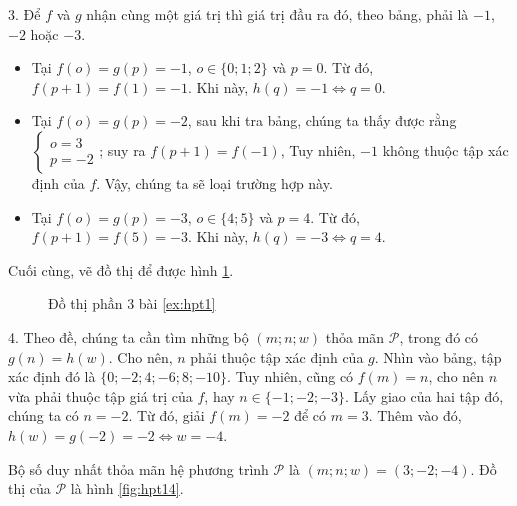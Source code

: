 3. Để $f$ và $g$ nhận cùng một giá trị thì giá trị đầu ra đó, theo bảng, phải là $-1$, $-2$ hoặc $-3$.
\begin{itemize}
   \item Tại $f(o) = g(p) = -1$, $o \in \{0; 1; 2\}$ và $p = 0$. Từ đó, $f(p + 1) = f(1) = -1$. Khi này, $h(q) = -1 \iff q = 0$.
   \item Tại $f(o) = g(p) = -2$, sau khi tra bảng, chúng ta thấy được rằng $\begin{cases}o = 3\\p = -2\end{cases}$; suy ra $f(p + 1) = f(-1)$, Tuy nhiên, $-1$ không thuộc tập xác định của $f$. Vậy, chúng ta sẽ loại trường hợp này.
   \item Tại $f(o) = g(p) = -3$, $o \in \{4; 5\}$ và $p = 4$. Từ đó, $f(p + 1) = f(5) = -3$. Khi này, $h(q) = -3 \iff q = 4$.
\end{itemize}
Cuối cùng, vẽ đồ thị để được hình \ref{fig:hpt13}.

\begin{figure}[H]
   \centering
   \caption{Đồ thị phần 3 bài \ref{ex:hpt1}}
   \label{fig:hpt13}
\end{figure}

4. Theo đề, chúng ta cần tìm những bộ $(m;n;w)$ thỏa mãn $\mathcal{P}$, trong đó có $g(n) = h(w)$. Cho nên, $n$ phải thuộc tập xác định của $g$. Nhìn vào bảng, tập xác định đó là $\{0; -2; 4; -6; 8; -10\}$. Tuy nhiên, cũng có $f(m) = n$, cho nên $n$ vừa phải thuộc tập giá trị của $f$, hay $n \in \{-1; -2; -3\}$. Lấy giao của hai tập đó, chúng ta có $n = -2$. Từ đó, giải $f(m) = -2$ để có $m = 3$. Thêm vào đó, $h(w) = g(-2) = -2 \iff w = -4$.

Bộ số duy nhất thỏa mãn hệ phương trình $\mathcal{P}$ là $\left(m; n; w\right) = \left(3; -2; -4\right)$. Đồ thị của $\mathcal{P}$ là hình \ref{fig:hpt14}.


